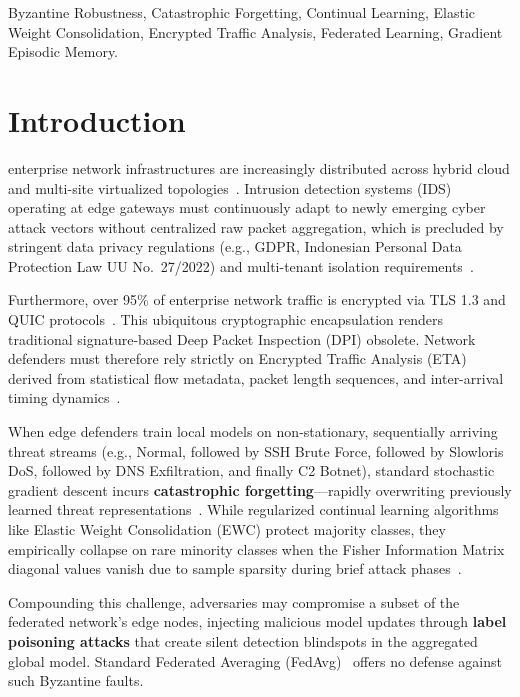 \documentclass[journal,10pt,twocolumn]{IEEEtran}
\begin{document}
\begin{IEEEkeywords}
Byzantine Robustness, Catastrophic Forgetting, Continual Learning, Elastic Weight Consolidation, Encrypted Traffic Analysis, Federated Learning, Gradient Episodic Memory.
\end{IEEEkeywords}

\section{Introduction}
 enterprise network infrastructures are increasingly distributed across hybrid cloud and multi-site virtualized topologies~\cite{ulya2025perancangan}. Intrusion detection systems (IDS) operating at edge gateways must continuously adapt to newly emerging cyber attack vectors without centralized raw packet aggregation, which is precluded by stringent data privacy regulations (e.g., GDPR, Indonesian Personal Data Protection Law UU No.~27/2022) and multi-tenant isolation requirements~\cite{bunko2026survey, hernandez2025intrusion}.

Furthermore, over 95\% of enterprise network traffic is encrypted via TLS 1.3 and QUIC protocols~\cite{wang2017malware}. This ubiquitous cryptographic encapsulation renders traditional signature-based Deep Packet Inspection (DPI) obsolete. Network defenders must therefore rely strictly on Encrypted Traffic Analysis (ETA) derived from statistical flow metadata, packet length sequences, and inter-arrival timing dynamics~\cite{sharafaldin2018toward}.

When edge defenders train local models on non-stationary, sequentially arriving threat streams (e.g., Normal, followed by SSH Brute Force, followed by Slowloris DoS, followed by DNS Exfiltration, and finally C2 Botnet), standard stochastic gradient descent incurs \textbf{catastrophic forgetting}---rapidly overwriting previously learned threat representations~\cite{kirkpatrick2017overcoming}. While regularized continual learning algorithms like Elastic Weight Consolidation (EWC) protect majority classes, they empirically collapse on rare minority classes when the Fisher Information Matrix diagonal values vanish due to sample sparsity during brief attack phases~\cite{hamedi2025federated, birashk2025federated}.

Compounding this challenge, adversaries may compromise a subset of the federated network's edge nodes, injecting malicious model updates through \textbf{label poisoning attacks} that create silent detection blindspots in the aggregated global model. Standard Federated Averaging (FedAvg)~\cite{mcmahan2017communication} offers no defense against such Byzantine faults.
\end{document}
